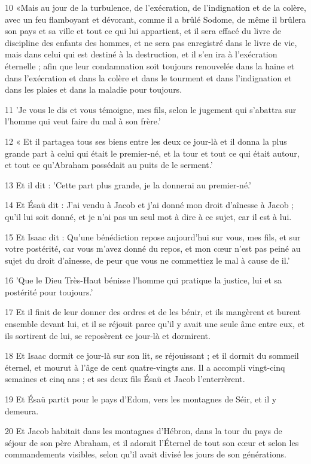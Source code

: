 \par 10 «Mais au jour de la turbulence, de l'exécration, de l'indignation et de la colère, avec un feu flamboyant et dévorant, comme il a brûlé Sodome, de même il brûlera son pays et sa ville et tout ce qui lui appartient, et il sera effacé du livre de discipline des enfants des hommes, et ne sera pas enregistré dans le livre de vie, mais dans celui qui est destiné à la destruction, et il s'en ira à l'exécration éternelle ; afin que leur condamnation soit toujours renouvelée dans la haine et dans l'exécration et dans la colère et dans le tourment et dans l'indignation et dans les plaies et dans la maladie pour toujours.
\par 11 'Je vous le dis et vous témoigne, mes fils, selon le jugement qui s'abattra sur l'homme qui veut faire du mal à son frère.'
\par 12 « Et il partagea tous ses biens entre les deux ce jour-là et il donna la plus grande part à celui qui était le premier-né, et la tour et tout ce qui était autour, et tout ce qu'Abraham possédait au puits de le serment.'
\par 13 Et il dit : 'Cette part plus grande, je la donnerai au premier-né.'
\par 14 Et Ésaü dit : J'ai vendu à Jacob et j'ai donné mon droit d'aînesse à Jacob ; qu'il lui soit donné, et je n'ai pas un seul mot à dire à ce sujet, car il est à lui.
\par 15 Et Isaac dit : Qu'une bénédiction repose aujourd'hui sur vous, mes fils, et sur votre postérité, car vous m'avez donné du repos, et mon cœur n'est pas peiné au sujet du droit d'aînesse, de peur que vous ne commettiez le mal à cause de il.'
\par 16 'Que le Dieu Très-Haut bénisse l'homme qui pratique la justice, lui et sa postérité pour toujours.'
\par 17 Et il finit de leur donner des ordres et de les bénir, et ils mangèrent et burent ensemble devant lui, et il se réjouit parce qu'il y avait une seule âme entre eux, et ils sortirent de lui, se reposèrent ce jour-là et dormirent.
\par 18 Et Isaac dormit ce jour-là sur son lit, se réjouissant ; et il dormit du sommeil éternel, et mourut à l'âge de cent quatre-vingts ans. Il a accompli vingt-cinq semaines et cinq ans ; et ses deux fils Ésaü et Jacob l'enterrèrent.
\par 19 Et Ésaü partit pour le pays d'Edom, vers les montagnes de Séir, et il y demeura.
\par 20 Et Jacob habitait dans les montagnes d'Hébron, dans la tour du pays de séjour de son père Abraham, et il adorait l'Éternel de tout son cœur et selon les commandements visibles, selon qu'il avait divisé les jours de son générations.
